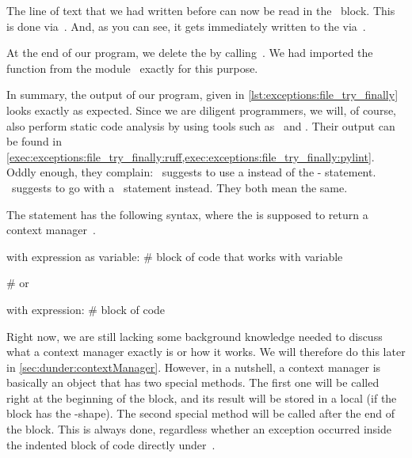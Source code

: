 The line of text that we had written before can now be read in the ~block.
This is done via~.
And, as you can see, it gets immediately written to the  via~.

At the end of our program, we delete the  by calling~.
We had imported the  function from the module~ exactly for this purpose.

In summary, the output of our program, given in \cref{lst:exceptions:file_try_finally} looks exactly as expected.
Since we are diligent programmers, we will, of course, also perform static code analysis by using tools such as \ruff\ and \pylint.
Their output can be found in \cref{exec:exceptions:file_try_finally:ruff,exec:exceptions:file_try_finally:pylint}.
Oddly enough, they complain:
\ruff\ suggests to use a  instead of the - statement.
\pylint\ suggests to go with a ~statement instead.
They both mean the same.

%
%
The  statement has the following syntax, where the  is supposed to return a context manager~\cite{PSF2024WSCM,PSF2024CUFWSC,PSF2024TWS,PEP343}.%
%
\begin{pythonSyntax}
with expression as variable:
    # block of code that works with variable

# or

with expression:
    # block of code
\end{pythonSyntax}
%
Right now, we are still lacking some background knowledge needed to discuss what a context manager exactly is or how it works.
We will therefore do this later in \cref{sec:dunder:contextManager}.
However, in a nutshell, a context manager is basically an object that has two special methods.
The first one will be called right at the beginning of the  block, and its result will be stored in a local  (if the  block has the -shape).
The second special method will be called after the end of the  block.
This is always done, regardless whether an exception occurred inside the indented block of code directly under~.

